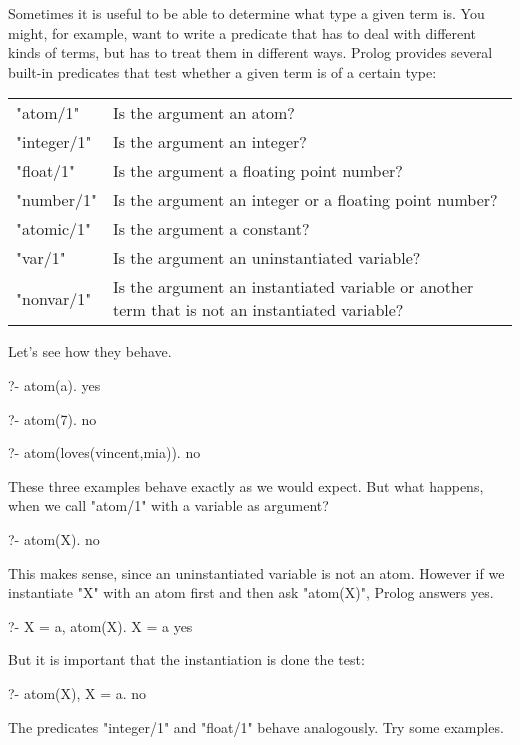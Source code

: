 \begin{center}
    { 
         { 
               { 
                  }}
       }

\end{center}

Sometimes it is useful to be able to determine what type a given term
is. You might, for example, want to write a predicate that has to deal
with different kinds of terms, but has to treat them in different
ways.  Prolog provides several built-in predicates that test whether a
given term is of a certain type:

\begin{center}\begin{tabular}{ll}
"atom/1"&Is the argument an atom?\\ \index{PROLOG atom/1@\texttt{atom/1}}
"integer/1"&Is  the argument  an integer?\\ \index{PROLOG integer/1@\texttt{integer/1}}
"float/1"&Is the argument a floating point number?\\ \index{PROLOG float/1@\texttt{float/1}}
"number/1"&Is  the argument an integer or a floating point number?\\ \index{PROLOG number/1@\texttt{number/1}}
"atomic/1"&Is the  argument a constant?\\ \index{PROLOG atomic/1@\texttt{atomic/1}}
"var/1"&Is the argument an uninstantiated variable?\\ \index{PROLOG var/1@\texttt{var/1}}
"nonvar/1"&\parbox[t]{0.75\textwidth}{Is  the argument an instantiated variable or another term that is not an instantiated variable?} 
\end{tabular}\end{center}


Let's see how they behave.

\begin{LPNcodedisplay}
?- atom(a).
yes

?- atom(7).
no

?- atom(loves(vincent,mia)).
no
\end{LPNcodedisplay}
These three examples behave exactly as we would expect.  But what
happens, when we call "atom/1" with a variable as argument?
\begin{LPNcodedisplay}
?- atom(X).
no
\end{LPNcodedisplay}
This makes sense, since an uninstantiated variable is not an atom.
However if we instantiate "X" with an atom first and then ask
"atom(X)", Prolog answers yes.
\begin{LPNcodedisplay}
?- X = a, atom(X).
X = a
yes
\end{LPNcodedisplay}
But it is important that the instantiation is done  the
test:
\begin{LPNcodedisplay}
?- atom(X), X = a.
no
\end{LPNcodedisplay}
The predicates "integer/1" and "float/1" behave analogously.  Try some
examples.

